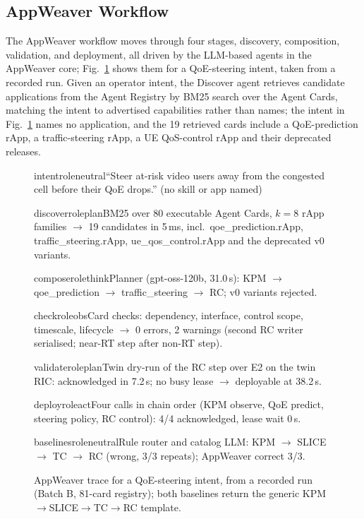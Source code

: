 \documentclass[conference]{IEEEtran}
\begin{document}
\subsection{AppWeaver Workflow}
The AppWeaver workflow moves through four stages, discovery, composition, validation, and deployment, all driven by the LLM-based agents in the AppWeaver core; Fig.~\ref{fig:trace} shows them for a QoE-steering intent, taken from a recorded run. Given an operator intent, the Discover agent retrieves candidate applications from the Agent Registry by BM25 search over the Agent Cards, matching the intent to advertised capabilities rather than names; the intent in Fig.~\ref{fig:trace} names no application, and the 19 retrieved cards include a QoE-prediction rApp, a traffic-steering rApp, a UE QoS-control rApp and their deprecated releases.

\begin{figure}[htbp]
\centering
\begin{awstep}{intent}{roleneutral}``Steer at-risk video users away from the congested cell before their QoE drops.'' (no skill or app named)\end{awstep}
\begin{awstep}{discover}{roleplan}BM25 over 80 executable Agent Cards, $k{=}8$ rApp families $\rightarrow$ 19 candidates in 5\,ms, incl.\ qoe\_prediction.rApp, traffic\_steering.rApp, ue\_qos\_control.rApp and the deprecated v0 variants.\end{awstep}
\begin{awstep}{compose}{rolethink}Planner (gpt-oss-120b, 31.0\,s): KPM $\rightarrow$ qoe\_prediction $\rightarrow$ traffic\_steering $\rightarrow$ RC; v0 variants rejected.\end{awstep}
\begin{awstep}{check}{roleobs}Card checks: dependency, interface, control scope, timescale, lifecycle $\rightarrow$ 0 errors, 2 warnings (second RC writer serialised; near-RT step after non-RT step).\end{awstep}
\begin{awstep}{validate}{roleplan}Twin dry-run of the RC step over E2 on the twin RIC: acknowledged in 7.2\,s; no busy lease $\rightarrow$ deployable at 38.2\,s.\end{awstep}
\begin{awstep}{deploy}{roleact}Four calls in chain order (KPM observe, QoE predict, steering policy, RC control): 4/4 acknowledged, lease wait 0\,s.\end{awstep}
\begin{awstep}{baselines}{roleneutral}Rule router and catalog LLM: KPM $\rightarrow$ SLICE $\rightarrow$ TC $\rightarrow$ RC (wrong, 3/3 repeats); AppWeaver correct 3/3.\end{awstep}
\caption{AppWeaver trace for a QoE-steering intent, from a recorded run (Batch B, 81-card registry); both baselines return the generic KPM$\rightarrow$SLICE$\rightarrow$TC$\rightarrow$RC template.}
\label{fig:trace}
\end{figure}
\end{document}
